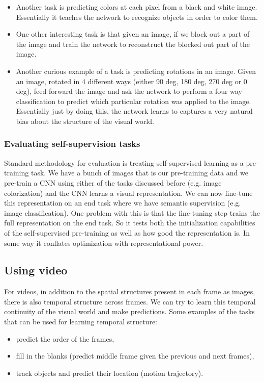 \begin{itemize}
\item Another task is predicting colors at each pixel from a black and white image. Essentially it teaches the network to recognize objects in order to color them. 

\item One other interesting task is that given an image, if we block out a part of the image and train the network to reconstruct the blocked out part of the image. 

\item Another curious example of a task is predicting rotations in an image. Given an image, rotated in 4 different ways (either 90 deg, 180 deg, 270 deg or 0 deg), feed forward the image and ask the network to perform a four way classification to predict which particular rotation was applied to the image. Essentially just by doing this, the network learns to captures a very natural bias about the structure of the visual world.
\end{itemize}{}

\subsubsection{Evaluating self-supervision tasks}
Standard methodology for evaluation is treating self-supervised learning as a pre-training task. We have a bunch of images that is our pre-training data and we pre-train a CNN using either of the tasks discussed before (e.g. image colorization) and the CNN learns a visual representation. We can now fine-tune this representation on an end task where we have semantic supervision (e.g. image classification). One problem with this is that the fine-tuning step trains the full representation on the end task. So it tests both the initialization capabilities of the self-supervised pre-training as well as how good the representation is. In some way it conflates optimization with representational power.

\subsection{Using video}
For videos, in addition to the spatial structures present in each frame as images, there is also temporal structure across frames.
We can try to learn this temporal continuity of the visual world and make predictions. 
Some examples of the tasks that can be used for learning temporal structure:

\begin{itemize}
\item predict the order of the frames,
\item fill in the blanks (predict middle frame given the previous and next frames),
\item track objects and predict their location (motion trajectory).
\end{itemize}

